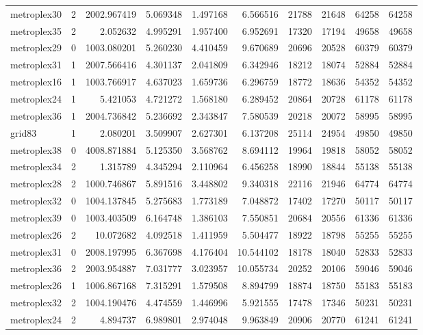 \begin{longtable}{|l|r|r|r|r|r|r|r|r|r|}
metroplex30 & 2 & 2002.967419 & 5.069348 & 1.497168 & 6.566516 & 21788 & 21648 & 64258 & 64258 \\
metroplex35 & 2 & 2.052632 & 4.995291 & 1.957400 & 6.952691 & 17320 & 17194 & 49658 & 49658 \\
metroplex29 & 0 & 1003.080201 & 5.260230 & 4.410459 & 9.670689 & 20696 & 20528 & 60379 & 60379 \\
metroplex31 & 1 & 2007.566416 & 4.301137 & 2.041809 & 6.342946 & 18212 & 18074 & 52884 & 52884 \\
metroplex16 & 1 & 1003.766917 & 4.637023 & 1.659736 & 6.296759 & 18772 & 18636 & 54352 & 54352 \\
metroplex24 & 1 & 5.421053 & 4.721272 & 1.568180 & 6.289452 & 20864 & 20728 & 61178 & 61178 \\
metroplex36 & 1 & 2004.736842 & 5.236692 & 2.343847 & 7.580539 & 20218 & 20072 & 58995 & 58995 \\
grid83 & 1 & 2.080201 & 3.509907 & 2.627301 & 6.137208 & 25114 & 24954 & 49850 & 49850 \\
metroplex38 & 0 & 4008.871884 & 5.125350 & 3.568762 & 8.694112 & 19964 & 19818 & 58052 & 58052 \\
metroplex34 & 2 & 1.315789 & 4.345294 & 2.110964 & 6.456258 & 18990 & 18844 & 55138 & 55138 \\
metroplex28 & 2 & 1000.746867 & 5.891516 & 3.448802 & 9.340318 & 22116 & 21946 & 64774 & 64774 \\
metroplex32 & 0 & 1004.137845 & 5.275683 & 1.773189 & 7.048872 & 17402 & 17270 & 50117 & 50117 \\
metroplex39 & 0 & 1003.403509 & 6.164748 & 1.386103 & 7.550851 & 20684 & 20556 & 61336 & 61336 \\
metroplex26 & 2 & 10.072682 & 4.092518 & 1.411959 & 5.504477 & 18922 & 18798 & 55255 & 55255 \\
metroplex31 & 0 & 2008.197995 & 6.367698 & 4.176404 & 10.544102 & 18178 & 18040 & 52833 & 52833 \\
metroplex36 & 2 & 2003.954887 & 7.031777 & 3.023957 & 10.055734 & 20252 & 20106 & 59046 & 59046 \\
metroplex26 & 1 & 1006.867168 & 7.315291 & 1.579508 & 8.894799 & 18874 & 18750 & 55183 & 55183 \\
metroplex32 & 2 & 1004.190476 & 4.474559 & 1.446996 & 5.921555 & 17478 & 17346 & 50231 & 50231 \\
metroplex24 & 2 & 4.894737 & 6.989801 & 2.974048 & 9.963849 & 20906 & 20770 & 61241 & 61241 \\

\end{longtable}
